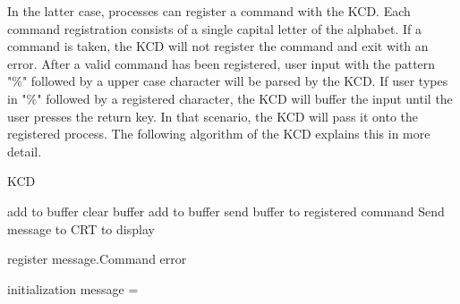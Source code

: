 \documentclass[12pt]{report}
\begin{document}
In the latter case, processes can register a command with the KCD. Each command registration consists of a single capital letter of the alphabet. If a command is taken, the KCD will not register the command and exit with an error. After a valid command has been registered, user input with the pattern "\%" followed by a upper case character will be parsed by the KCD. If user types in "\%" followed by a registered character, the KCD will buffer the input until the user presses the return key. In that scenario, the KCD will pass it onto the registered process. The following algorithm of the KCD explains this in more detail.

\begin{algorithm}
  \caption{KCD}
  \begin{algorithmic}[1]
                \State add to buffer
            \Else
                \State clear buffer
            \EndIf
            \State add to buffer
            \State send buffer to registered command
        \EndIf
        \State Send message to CRT to display

    \EndFunction

    \bigskip

            \State register message.Command
        \Else
            \State error
        \EndIf
    \EndFunction

    \bigskip

        \State initialization
            \State message = 
                \State {}
                \State {}
            \EndIf
        \EndWhile
    \EndFunction
  \end{algorithmic}
\end{algorithm}
\end{document}
